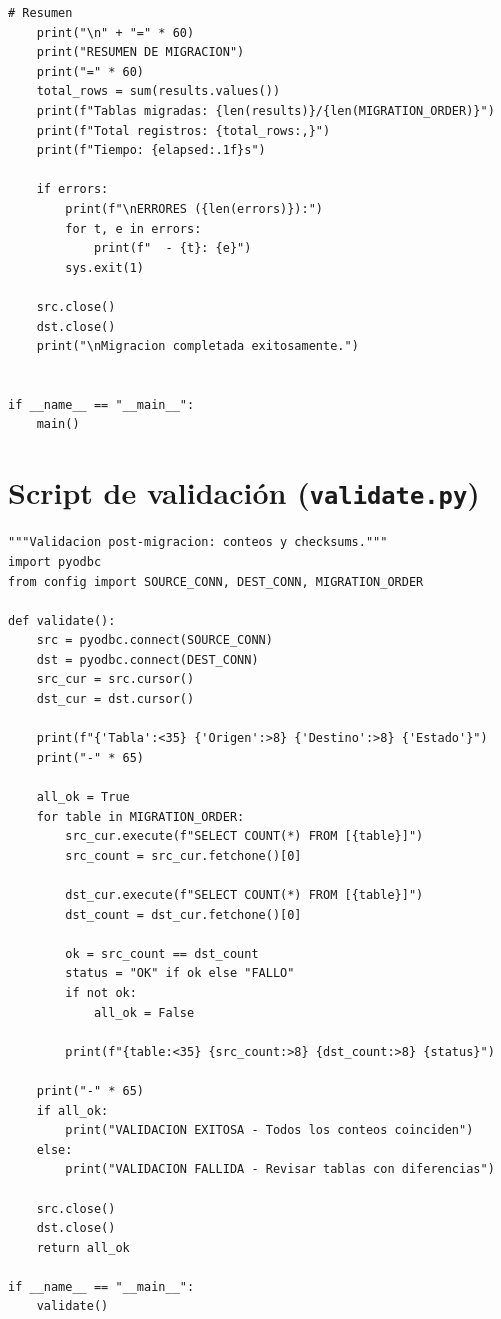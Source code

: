 \documentclass[12pt,a4paper,twoside]{report}
\begin{document}
\begin{lstlisting}[style=pythonstyle, caption={migrate.py --- Orquestador principal}]
    # Resumen
    print("\n" + "=" * 60)
    print("RESUMEN DE MIGRACION")
    print("=" * 60)
    total_rows = sum(results.values())
    print(f"Tablas migradas: {len(results)}/{len(MIGRATION_ORDER)}")
    print(f"Total registros: {total_rows:,}")
    print(f"Tiempo: {elapsed:.1f}s")

    if errors:
        print(f"\nERRORES ({len(errors)}):")
        for t, e in errors:
            print(f"  - {t}: {e}")
        sys.exit(1)

    src.close()
    dst.close()
    print("\nMigracion completada exitosamente.")


if __name__ == "__main__":
    main()
\end{lstlisting}

\section{Script de validaci\'on (\texttt{validate.py})}

\begin{lstlisting}[style=pythonstyle, caption={validate.py --- Validaci\'on post-migraci\'on}]
"""Validacion post-migracion: conteos y checksums."""
import pyodbc
from config import SOURCE_CONN, DEST_CONN, MIGRATION_ORDER

def validate():
    src = pyodbc.connect(SOURCE_CONN)
    dst = pyodbc.connect(DEST_CONN)
    src_cur = src.cursor()
    dst_cur = dst.cursor()

    print(f"{'Tabla':<35} {'Origen':>8} {'Destino':>8} {'Estado'}")
    print("-" * 65)

    all_ok = True
    for table in MIGRATION_ORDER:
        src_cur.execute(f"SELECT COUNT(*) FROM [{table}]")
        src_count = src_cur.fetchone()[0]

        dst_cur.execute(f"SELECT COUNT(*) FROM [{table}]")
        dst_count = dst_cur.fetchone()[0]

        ok = src_count == dst_count
        status = "OK" if ok else "FALLO"
        if not ok:
            all_ok = False

        print(f"{table:<35} {src_count:>8} {dst_count:>8} {status}")

    print("-" * 65)
    if all_ok:
        print("VALIDACION EXITOSA - Todos los conteos coinciden")
    else:
        print("VALIDACION FALLIDA - Revisar tablas con diferencias")

    src.close()
    dst.close()
    return all_ok

if __name__ == "__main__":
    validate()
\end{lstlisting}
\end{document}
